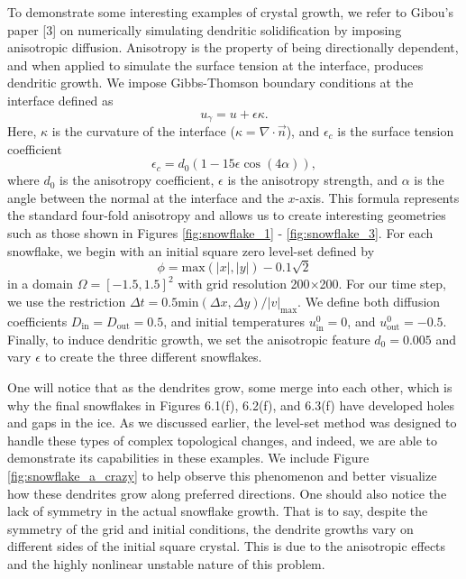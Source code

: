 \documentclass[oneside,12pt,final]{/Applications/TeX/packages/ucthesis-CA2012}
\begin{document}
\begin{mainmatter}
To demonstrate some interesting examples of crystal growth, we refer to Gibou's paper [3] on numerically simulating dendritic solidification by imposing anisotropic diffusion. Anisotropy is the property of being directionally dependent, and when applied to simulate the surface tension at the interface, produces dendritic growth. We impose Gibbs-Thomson boundary conditions at the interface defined as
\begin{equation}\label{eqn:Gibbs}
 u_\gamma = u + \epsilon \kappa.
\end{equation}
Here, $\kappa$ is the curvature of the interface ($\kappa = \nabla \cdot \vec{n}$), and $\epsilon_c$ is the surface tension coefficient
\begin{equation}
\epsilon_c = d_0(1-15 \epsilon \cos(4\alpha)),
\end{equation}
where $d_0$ is the anisotropy coefficient, $\epsilon$ is the anisotropy strength, and $\alpha$ is the angle between the normal at the interface and the $x$-axis. This formula represents the standard four-fold anisotropy and allows us to create interesting geometries such as those shown in Figures \ref{fig:snowflake_1} - \ref{fig:snowflake_3}. For each snowflake, we begin with an initial square zero level-set defined by
\begin{equation}
\phi = \text{max}(|x|,|y|) - 0.1 \sqrt{2}
\end{equation}
in a domain $\Omega = [-1.5,1.5]^2$ with grid resolution 200$\times$200. For our time step, we use the restriction $\Delta t = 0.5 \text{min}(\Delta x,\Delta y)/|v|_\text{max}$. We define both diffusion coefficients $D_{\text{in}} = D_{\text{out}} = 0.5$, and initial temperatures $u_\text{in}^0 = 0$, and $u^0_\text{out} = -0.5$. Finally, to induce dendritic growth, we set the anisotropic feature $d_0 = 0.005$ and vary $\epsilon$ to create the three different snowflakes.

One will notice that as the dendrites grow, some merge into each other, which is why the final snowflakes in Figures 6.1(f), 6.2(f), and 6.3(f) have developed holes and gaps in the ice. As we discussed earlier, the level-set method was designed to handle these types of complex topological changes, and indeed, we are able to demonstrate its capabilities in these examples. We include Figure \ref{fig:snowflake_a_crazy} to help observe this phenomenon and better visualize how these dendrites grow along preferred directions. One should also notice the lack of symmetry in the actual snowflake growth. That is to say, despite the symmetry of the grid and initial conditions, the dendrite growths vary on different sides of the initial square crystal. This is due to the anisotropic effects and the highly nonlinear unstable nature of this problem.


\end{mainmatter}
\end{document}

